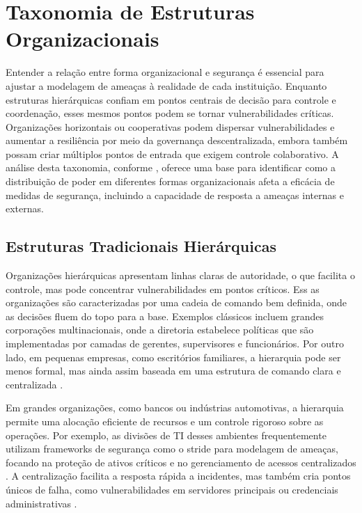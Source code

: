 \section{Taxonomia de Estruturas Organizacionais}
\label{sec:taxonomia_de_estruturas_organizacionais}

Entender a relação entre forma organizacional e segurança é essencial para
ajustar a modelagem de ameaças à realidade de cada instituição. Enquanto
estruturas hierárquicas confiam em pontos centrais de decisão para controle
e coordenação, esses mesmos pontos podem se tornar vulnerabilidades
críticas. Organizações horizontais ou cooperativas podem
dispersar vulnerabilidades e aumentar a resiliência por meio da governança
descentralizada, embora também possam criar múltiplos pontos de entrada que
exigem controle colaborativo. A análise desta taxonomia, conforme
\cite{WorkerCooperativesinAmerica, RealNotNominalGlobalDemocracy}, oferece
uma base para identificar como a distribuição de poder em diferentes formas
organizacionais afeta a eficácia de medidas de segurança, incluindo a
capacidade de resposta a ameaças internas e externas.

\subsection{Estruturas Tradicionais Hierárquicas}
\label{sec:estruturas_tradicionais_hierarquicas}

Organizações hierárquicas apresentam linhas claras de autoridade, o que
facilita o controle, mas pode concentrar vulnerabilidades em pontos
críticos. Ess as organizações são caracterizadas por uma cadeia de comando
bem definida, onde as decisões fluem do topo para a base. Exemplos
clássicos incluem grandes corporações multinacionais, onde a diretoria
estabelece políticas que são implementadas por camadas de gerentes,
supervisores e funcionários. Por outro lado, em pequenas empresas, como
escritórios familiares, a hierarquia pode ser menos formal, mas ainda assim
baseada em uma estrutura de comando clara e centralizada \cite{WorkerCooperativesinAmerica}.

Em grandes organizações, como bancos ou indústrias automotivas, a
hierarquia permite uma alocação eficiente de recursos e um controle
rigoroso sobre as operações. Por exemplo, as divisões de TI desses
ambientes frequentemente utilizam frameworks de segurança como o
\gls{stride} para modelagem de ameaças, focando na proteção de ativos
críticos e no gerenciamento de acessos centralizados
\cite{ThreatModelingASystematicLiteratureReview}. A centralização facilita
a resposta rápida a incidentes, mas também cria pontos únicos de falha,
como vulnerabilidades em servidores principais ou credenciais
administrativas \cite{DoArtifactsHavePolitics}.


